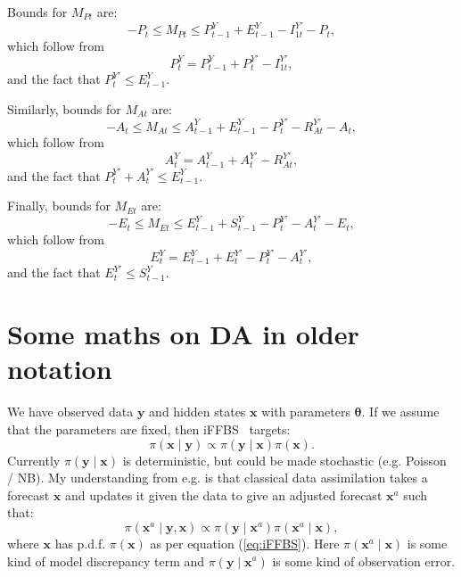 \documentclass[a4paper]{article}
\newcommand{\btheta}{\bm{\theta}}
\newcommand{\bx}{\bm{x}}
\newcommand{\by}{\bm{y}}
\begin{document}
Bounds for $M_{Pt}$ are:
\begin{equation*}
    -P_t \leq M_{Pt} \leq P^Y_{t - 1} + E^Y_{t - 1} - I^{Y\prime}_{1t} - P_t,
\end{equation*}
which follow from 
\begin{equation*}
    P^Y_t = P^Y_{t - 1} + P^{Y\prime}_t - I^{Y\prime}_{1t},
\end{equation*}
and the fact that $P^{Y\prime}_t \leq E^Y_{t - 1}$.

Similarly, bounds for $M_{At}$ are:
\begin{equation*}
    -A_t \leq M_{At} \leq A^Y_{t - 1} + E^Y_{t - 1} - P^{Y\prime}_{t} - R^{Y\prime}_{At} - A_t,
\end{equation*}
which follow from 
\begin{equation*}
    A^Y_t = A^Y_{t - 1} + A^{Y\prime}_t - R^{Y\prime}_{At},
\end{equation*}
and the fact that $P^{Y\prime}_t + A^{Y\prime}_t \leq E^Y_{t - 1}$.

Finally, bounds for $M_{Et}$ are:
\begin{equation*}
    -E_t \leq M_{Et} \leq E^Y_{t - 1} + S^Y_{t - 1} - P^{Y\prime}_{t} - A^{Y\prime}_t - E_t,
\end{equation*}
which follow from 
\begin{equation*}
    E^Y_t = E^Y_{t - 1} + E^{Y\prime}_t - P^{Y\prime}_t - A^{Y\prime}_t,
\end{equation*}
and the fact that $E^{Y\prime}_t \leq S^Y_{t - 1}$.

\section*{Some maths on DA in older notation}

We have observed data $\by$ and hidden states $\bx$ with parameters $\btheta$. If we assume that the parameters are fixed, then iFFBS~\citep{touloupouetal:2020} targets:
\begin{equation}
    \pi\left(\bx \mid \by\right) \propto \pi\left(\by \mid \bx\right)\pi\left(\bx\right). \label{eq:iFFBS}
\end{equation}
Currently $\pi\left(\by \mid \bx\right)$ is deterministic, but could be made stochastic (e.g. Poisson / NB). My understanding from e.g. \cite{lahoz_schneider:2014} is that classical data assimilation takes a forecast $\bx$ and updates it given the data to give an adjusted forecast $\bx^a$ such that:
\begin{equation}
    \pi\left(\bx^a \mid \by, \bx\right) \propto \pi\left(\by \mid \bx^a\right)\pi\left(\bx^a \mid \bx\right), \label{eq:DA}
\end{equation}
where $\bx$ has p.d.f. $\pi\left(\bx\right)$ as per equation (\ref{eq:iFFBS}). Here $\pi\left(\bx^a \mid \bx\right)$ is some kind of model discrepancy term and $\pi\left(\by \mid \bx^a\right)$ is some kind of observation error. 
\end{document}
